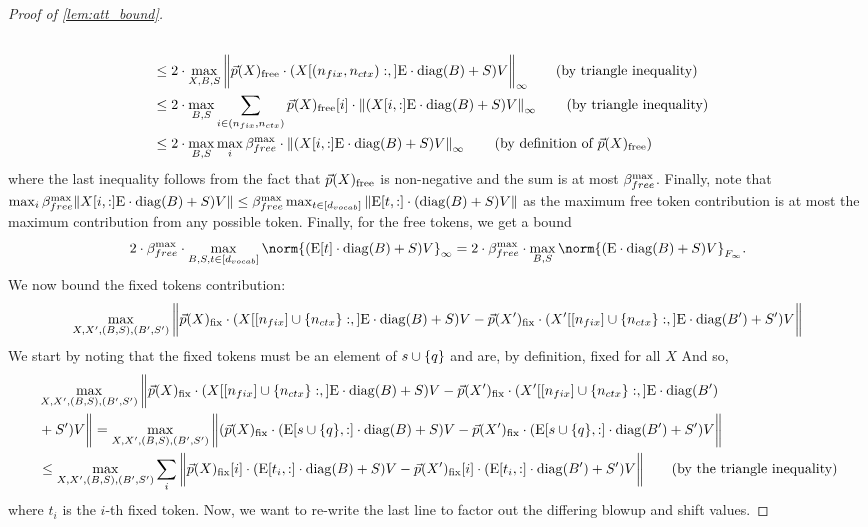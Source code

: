\begin{proof}[Proof of \cref{lem:att_bound}]
\begin{align*}
		\\
		&\leq 2 \cdot \max_{X, B, S} \bigg\|\vec{p}(X)_\free \cdot (X[(\nfix, \nctx):, ] \Embed \cdot \diag(B) + S) V \bigg\|_\infty \tag{by triangle inequality} \\
		&\leq 2 \cdot \max_{B, S} \sum_{i \in (\nfix, \nctx)} \vec{p}(X)_\free[i]  \cdot \left\| (X[i, :] \Embed \cdot \diag(B) + S) V \right\|_\infty \tag{by  triangle inequality} \\
		&\leq 2 \cdot \max_{B, S} \max_i \ssMaxFB \cdot \left\|(X[i, :] \Embed \cdot \diag(B) + S) V \right\|_\infty \tag{by definition of $\vec{p}(X)_\free$} 
	\end{align*}
	where the last inequality follows from the fact that $\vec{p}(X)_{\text{free}}$ is non-negative and the sum is at most ${\beta}_{free}^{\max}$.
	Finally, note that $\max_i {\beta}_{free}^{\max} \| X[i, :] \text{E} \cdot \mathrm{diag}(B) + S) V\| \leq {\beta}_{free}^{\max}\max_{t \in [{d_{vocab}}]} \|\text{E}[t, :] \cdot (\mathrm{diag}(B) + S) V\|$ as the maximum free token contribution is at most the maximum contribution from any possible token.
	Finally, for the free tokens, we get a bound
	\[
		2 \cdot \ssMaxFB \cdot \max_{B, S, t \in [\dVocab]} \norm{(\Embed[t] \cdot \diag(B) + S) V}_\infty 
		= 2 \cdot \ssMaxFB \cdot \max_{B, S} \norm{(\Embed \cdot \diag(B) + S) V}_\frobInf.
	\]
	We now bound the fixed tokens contribution:
	\[
		\max_{X, X', (B, S), (B', S')} \bigg\|\vec{p}(X)_{\text{fix}} \cdot (X[[n_{fix}] \cup \{{n_{ctx}}\}:, ] \text{E} \cdot \mathrm{diag}(B) + S) V - \vec{p}(X')_{\text{fix}} \cdot (X'[[n_{fix}] \cup \{{n_{ctx}}\}:, ] \text{E} \cdot \mathrm{diag}(B') + S') V\bigg\|
	\]
	We start by noting that the fixed tokens must be an element of ${s} \cup \{q\}$ and are, by definition, fixed for all $X$
	And so,
	\begin{align*}
		&\max_{X, X', (B, S), (B', S')} \bigg\|\vec{p}(X)_{\text{fix}} \cdot (X[[n_{fix}] \cup \{{n_{ctx}}\}:, ] \text{E} \cdot \mathrm{diag}(B) + S) V - \vec{p}(X')_{\text{fix}} \cdot (X'[[n_{fix}] \cup \{{n_{ctx}}\}:, ] \text{E} \cdot \mathrm{diag}(B') \\ &+ S') V\bigg\| = \max_{X, X', (B, S), (B', S')} \bigg\|(\vec{p}(X)_{\text{fix}} \cdot (\text{E}[s \cup \{q\}, :] \cdot \mathrm{diag}(B) + S) V - \vec{p}(X')_{\text{fix}} \cdot (\text{E}[s \cup \{q\}, :] \cdot \mathrm{diag}(B') + S') V\bigg\| \\
		&\leq \max_{X, X', (B, S), (B', S')} \sum_i \bigg\|\vec{p}(X)_{\text{fix}}[i] \cdot (\text{E}[t_i, :] \cdot \mathrm{diag}(B) + S) V - \vec{p}(X')_{\text{fix}}[i] \cdot (\text{E}[t_i, :] \cdot \mathrm{diag}(B') + S') V\bigg\| \tag{by the triangle inequality}
	\end{align*}
	where $t_i$ is the $i$-th fixed token.
	Now, we want to re-write the last line to factor out the differing blowup and shift values.

\end{proof}
